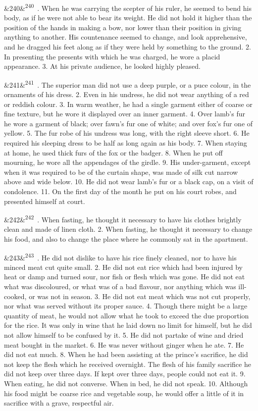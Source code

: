 \documentclass[12pt]{article}
\newcommand{\para}[1][]{\par\noindent\ifx&#1&\else\textsuperscript{\footnotesize #1}~\fi}
\begin{document}
\para[240] 1. When he was carrying the scepter of his ruler, he seemed to bend his body, as if he were not able to bear its weight. He did not hold it higher than the position of the hands in making a bow, nor lower than their position in giving anything to another. His countenance seemed to change, and look apprehensive, and he dragged his feet along as if they were held by something to the ground. 2. In presenting the presents with which he was charged, he wore a placid appearance. 3. At his private audience, he looked highly pleased.

\para[241] 1. The superior man did not use a deep purple, or a puce colour, in the ornaments of his dress. 2. Even in his undress, he did not wear anything of a red or reddish colour. 3. In warm weather, he had a single garment either of coarse or fine texture, but he wore it displayed over an inner garment. 4. Over lamb's fur he wore a garment of black; over fawn's fur one of white; and over fox's fur one of yellow. 5. The fur robe of his undress was long, with the right sleeve short. 6. He required his sleeping dress to be half as long again as his body. 7. When staying at home, he used thick furs of the fox or the badger. 8. When he put off mourning, he wore all the appendages of the girdle. 9. His under-garment, except when it was required to be of the curtain shape, was made of silk cut narrow above and wide below. 10. He did not wear lamb's fur or a black cap, on a visit of condolence. 11. On the first day of the month he put on his court robes, and presented himself at court.

\para[242] 1. When fasting, he thought it necessary to have his clothes brightly clean and made of linen cloth. 2. When fasting, he thought it necessary to change his food, and also to change the place where he commonly sat in the apartment.

\para[243] 1. He did not dislike to have his rice finely cleaned, nor to have his minced meat cut quite small. 2. He did not eat rice which had been injured by heat or damp and turned sour, nor fish or flesh which was gone. He did not eat what was discoloured, or what was of a bad flavour, nor anything which was ill-cooked, or was not in season. 3. He did not eat meat which was not cut properly, nor what was served without its proper sauce. 4. Though there might be a large quantity of meat, he would not allow what he took to exceed the due proportion for the rice. It was only in wine that he laid down no limit for himself, but he did not allow himself to be confused by it. 5. He did not partake of wine and dried meat bought in the market. 6. He was never without ginger when he ate. 7. He did not eat much. 8. When he had been assisting at the prince's sacrifice, he did not keep the flesh which he received overnight. The flesh of his family sacrifice he did not keep over three days. If kept over three days, people could not eat it. 9. When eating, he did not converse. When in bed, he did not speak. 10. Although his food might be coarse rice and vegetable soup, he would offer a little of it in sacrifice with a grave, respectful air.
\end{document}
